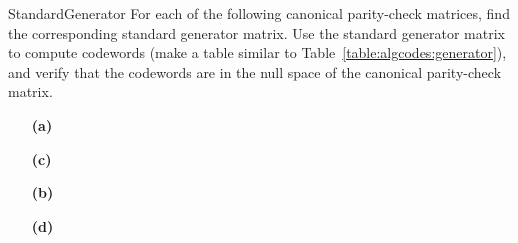 \begin{exercise}{StandardGenerator}
For each of the following canonical parity-check matrices, find the corresponding standard generator matrix. Use the standard generator matrix to compute codewords (make a table similar to Table~\ref{table:algcodes:generator}), and verify that the codewords are in the null space of the canonical parity-check matrix.
 
\vspace{3pt}        %
 
\hspace{-7pt}
\begin{minipage}[t]{4.6in}
\noindent
\begin{minipage}[t]{2.25in}
\begin{itemize}
 
 \item[{\bf (a)}]
 
 \item[{\bf (c)}]
 
\end{itemize}
\end{minipage} \hfill
\begin{minipage}[t]{2.25in}
\begin{itemize}
 
 \item[{\bf (b)}]
 
 \item[{\bf (d)}]
 
\end{itemize}
\end{minipage}
\end{minipage}
\end{exercise}

